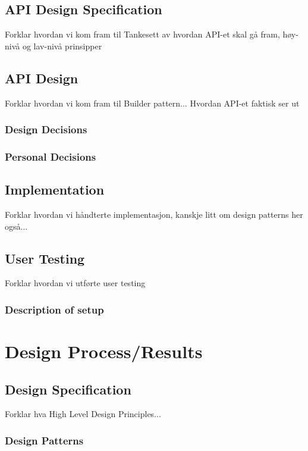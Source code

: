 \documentclass[12pt]{article}
\begin{document}
    \subsection{API Design Specification}
    Forklar hvordan vi kom fram til Tankesett av hvordan API-et skal gå fram, høy-nivå og lav-nivå prinsipper

    \subsection{API Design}
    Forklar hvordan vi kom fram til Builder pattern... Hvordan API-et faktisk ser ut

        \subsubsection{Design Decisions}

        \subsubsection{Personal Decisions}

    \subsection{Implementation}
    Forklar hvordan vi håndterte implementasjon, kanskje litt om design patterns her også...

    \subsection{User Testing}
    Forklar hvordan vi utførte user testing

        \subsubsection{Description of setup}

\section{Design Process/Results}

    \subsection{Design Specification}
    Forklar hva High Level Design Principles...

        \subsubsection{Design Patterns}
\end{document}
